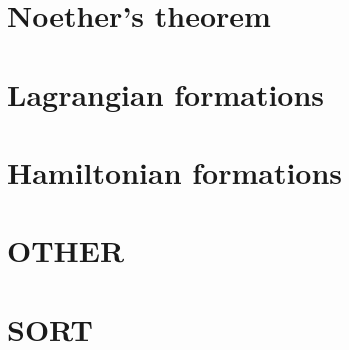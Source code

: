 \documentclass[oneside]{book}
\begin{document}
\part{Noether's theorem}


\part{Lagrangian formations}


\part{Hamiltonian formations}


\part{OTHER}


\part{SORT}

\end{document}
